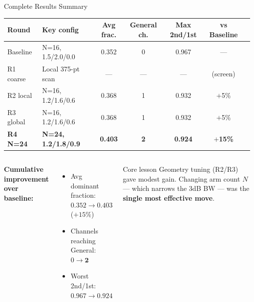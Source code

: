 \documentclass[aspectratio=169,10pt]{beamer}
\begin{document}
\begin{frame}{Complete Results Summary}
  \begin{center}
  \small
  \renewcommand{\arraystretch}{1.35}
  \begin{tabular}{llccccc}
    \toprule
    \textbf{Round} & \textbf{Key config} &
    \textbf{Avg frac.} & \textbf{General ch.} & \textbf{Max 2nd/1st} &
    \textbf{vs Baseline} \\
    \midrule
    Baseline   & N=16, 1.5/2.0/0.0 & 0.352 & 0 & 0.967 & — \\
    R1 coarse  & Local 375-pt scan  & —     & — & —     & (screen) \\
    R2 local   & N=16, 1.2/1.6/0.6 & 0.368 & 1 & 0.932 & $+$5\% \\
    R3 global  & N=16, 1.2/1.6/0.6 & 0.368 & 1 & 0.932 & $+$5\% \\
    \rowcolor{uw_gold!50}
    \textbf{R4 N=24} & \textbf{N=24, 1.2/1.8/0.9} & \textbf{0.403} &
    \textbf{2} & \textbf{0.924} & \textbf{$+$15\%} \\
    \bottomrule
  \end{tabular}
  \end{center}
  \vspace{4pt}
  \begin{columns}[T]
      \small\textbf{Cumulative improvement over baseline:}
      \begin{itemize}\setlength\itemsep{2pt}
        \item Avg dominant fraction: $0.352\to\mathbf{0.403}$ \;($+15\%$)
        \item Channels reaching General: $0\to\mathbf{2}$
        \item Worst 2nd/1st: $0.967\to\mathbf{0.924}$
      \end{itemize}
      \begin{block}{\small Core lesson}
        \small Geometry tuning (R2/R3) gave modest gain.
        Changing arm count $N$ — which narrows the 3dB BW —
        was the \textbf{single most effective move}.
      \end{block}
  \end{columns}
\end{frame}
\end{document}
